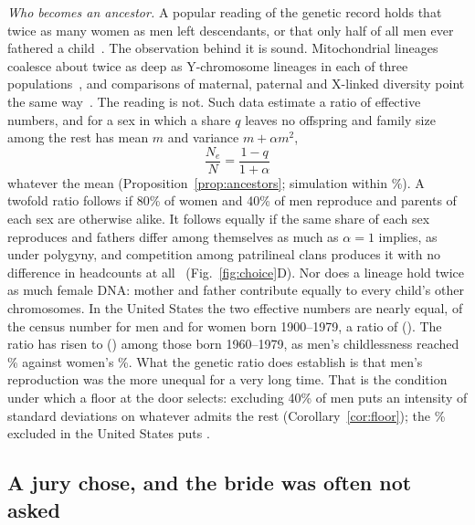 \emph{Who becomes an ancestor.} A popular reading of the genetic record holds that twice as many women as men left
descendants, or that only half of all men ever fathered a child~\cite{baumeister2010}. The observation behind it is sound.
Mitochondrial lineages coalesce about twice as deep as Y-chromosome lineages in each of three
populations~\cite{wilder2004}, and comparisons of maternal, paternal and X-linked diversity point the same
way~\cite{hammer2008,lippold2014}. The reading is not. Such data estimate a ratio of effective numbers, and for a sex in
which a share $q$ leaves no offspring and family size among the rest has mean $m$ and variance $m+\alpha m^2$,
\begin{equation}
\frac{N_e}{N}=\frac{1-q}{1+\alpha}\label{eq:ancestors}
\end{equation}
whatever the mean (Proposition~\ref{prop:ancestors}; simulation within \NtAncErr\%). A twofold ratio follows if 80\% of
women and 40\% of men reproduce and parents of each sex are otherwise alike. It follows equally if the same share of each
sex reproduces and fathers differ among themselves as much as $\alpha=1$ implies, as under polygyny, and competition among
patrilineal clans produces it with no difference in headcounts at all~\cite{zeng2018,karmin2015}
(Fig.~\ref{fig:choice}D). Nor does a lineage hold twice as much female DNA: mother and father contribute equally to every
child's other chromosomes. In the United States the two effective numbers are nearly equal, \VgNeM{} of the census number
for men and \VgNeW{} for women born 1900--1979, a ratio of \VgNeRatio{} (\VgNeRatioCI). The ratio has risen to
\VgNeRatioNew{} (\VgNeRatioNewCI) among those born 1960--1979, as men's childlessness reached \VgQMNew\% against women's
\VgQWNew\%. What the genetic ratio does establish is that men's reproduction was the more unequal for a very long time.
That is the condition under which a floor at the door selects: excluding 40\% of men puts an intensity of \NtIqForty{}
standard deviations on whatever admits the rest (Corollary~\ref{cor:floor}); the \VgQM\% excluded in the United States
puts \NtIqUS.

\subsection{A jury chose, and the bride was often not asked}\label{sec:reschoice}

